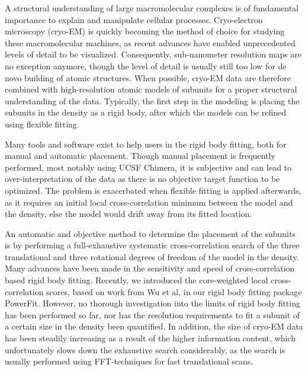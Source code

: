 
A structural understanding of large macromolecular complexes is of fundamental
importance to explain and manipulate cellular processes. Cryo-electron
microscopy (cryo-EM) is quickly becoming the method of choice for studying
these macromolecular machines, as recent advances have enabled unprecedented
levels of detail to be visualized. Consequently, sub-nanometer resolution maps
are no exception anymore, though the level of detail is usually still too low
for de novo building of atomic structures. When possible, cryo-EM data are
therefore combined with high-resolution atomic models of subunits for a proper
structural understanding of the data. Typically, the first step in the modeling
is placing the subunits in the density as a rigid body, after which the models
can be refined using flexible fitting.

Many tools and software exist to help users in the rigid body fitting, both for
manual and automatic placement. Though manual placement is frequently
performed, most notably using UCSF Chimera, it is subjective and can lead to
over-interpretation of the data as there is no objective target function to be
optimized. The problem is exacerbated when flexible fitting is applied
afterwards, as it requires an initial local cross-correlation minimum between
the model and the density, else the model would drift away from its fitted
location. 

An automatic and objective method to determine the placement of the subunits is
by performing a full-exhaustive systematic cross-correlation search of the
three translational and three rotational degrees of freedom of the model in the
density. Many advances have been made in the sensitivity and speed of
cross-correlation based rigid body fitting. Recently, we introduced the
core-weighted local cross-correlation scores, based on work from Wu et al, in
our rigid body fitting package PowerFit. However, no thorough investigation
into the limits of rigid body fitting has been performed so far, nor has the
resolution requirements to fit a subunit of a certain size in the density been
quantified. In addition, the size of cryo-EM data has been steadily increasing
as a result of the higher information content, which unfortunately slows down
the exhaustive search considerably, as the search is usually performed using
FFT-techniques for fast translational scans.

